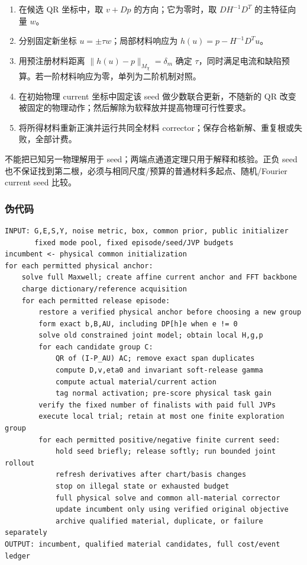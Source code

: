\documentclass[10pt,a4paper]{article}
\providecommand{\tightlist}{\setlength{\itemsep}{0pt}\setlength{\parskip}{0pt}}
\begin{document}
\begin{enumerate}
\def\labelenumi{\arabic{enumi}.}
\tightlist
\item
  在候选 QR 坐标中，取 \(v+Dp\) 的方向；它为零时，取 \(DH^{-1}D^T\)
  的主特征向量 \(w\)。
\item
  分别固定新坐标 \(u=\pm\tau w\)；局部材料响应为 \(h(u)=p-H^{-1}D^Tu\)。
\item
  用预注册材料距离 \(\|h(u)-p\|_{M_\chi}=\delta_m\) 确定
  \(\tau\)，同时满足电流和缺陷预算。若一阶材料响应为零，单列为二阶机制对照。
\item
  在初始物理 current 坐标中固定该 seed 做少数联合更新，不随新的 QR
  改变被固定的物理动作；然后解除为软释放并提高物理可行性要求。
\item
  将所得材料重新正演并运行共同全材料
  corrector；保存合格新解、重复根或失败，全部计费。
\end{enumerate}

不能把已知另一物理解用于 seed；两端点通道定理只用于解释和核验。正负 seed
也不保证找到第二根，必须与相同尺度/预算的普通材料多起点、随机/Fourier
current seed 比较。

\hypertarget{ux4f2aux4ee3ux7801}{%
\subsubsection{伪代码}\label{ux4f2aux4ee3ux7801}}

\begin{verbatim}
INPUT: G,E,S,Y, noise metric, box, common prior, public initializer
       fixed mode pool, fixed episode/seed/JVP budgets
incumbent <- physical common initialization
for each permitted physical anchor:
    solve full Maxwell; create affine current anchor and FFT backbone
    charge dictionary/reference acquisition
    for each permitted release episode:
        restore a verified physical anchor before choosing a new group
        form exact b,B,AU, including DP[h]e when e != 0
        solve old constrained joint model; obtain local H,g,p
        for each candidate group C:
            QR of (I-P_AU) AC; remove exact span duplicates
            compute D,v,eta0 and invariant soft-release gamma
            compute actual material/current action
            tag normal activation; pre-score physical task gain
        verify the fixed number of finalists with paid full JVPs
        execute local trial; retain at most one finite exploration group
        for each permitted positive/negative finite current seed:
            hold seed briefly; release softly; run bounded joint rollout
            refresh derivatives after chart/basis changes
            stop on illegal state or exhausted budget
            full physical solve and common all-material corrector
            update incumbent only using verified original objective
            archive qualified material, duplicate, or failure separately
OUTPUT: incumbent, qualified material candidates, full cost/event ledger
\end{verbatim}
\end{document}

